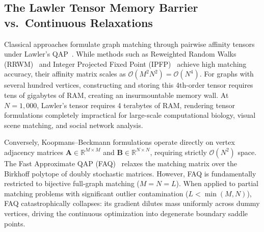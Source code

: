 \documentclass[a4paper,fleqn]{cas-dc}
\theoremstyle{thmstyleone}
\theoremstyle{thmstyletwo}
\theoremstyle{thmstylethree}
\begin{document}
\subsection{The Lawler Tensor Memory Barrier vs.\ Continuous Relaxations}
Classical approaches formulate graph matching through pairwise affinity tensors under Lawler's QAP~\cite{lawler1963, leordeanu2005}. While methods such as Reweighted Random Walks (RRWM)~\cite{cho2010rrwm} and Integer Projected Fixed Point (IPFP)~\cite{leordeanu2009ipfp} achieve high matching accuracy, their affinity matrix scales as $\mathcal{O}(M^2 N^2) = \mathcal{O}(N^4)$. For graphs with several hundred vertices, constructing and storing this 4th-order tensor requires tens of gigabytes of RAM, creating an insurmountable memory wall. At $N = 1{,}000$, Lawler's tensor requires 4 terabytes of RAM, rendering tensor formulations completely impractical for large-scale computational biology, visual scene matching, and social network analysis.

Conversely, Koopmans--Beckmann formulations operate directly on vertex adjacency matrices $\mathbf{A} \in \mathbb{R}^{M \times M}$ and $\mathbf{B} \in \mathbb{R}^{N \times N}$, requiring strictly $\mathcal{O}(N^2)$ space. The Fast Approximate QAP (FAQ)~\cite{vogelstein2015fast} relaxes the matching matrix over the Birkhoff polytope of doubly stochastic matrices. However, FAQ is fundamentally restricted to bijective full-graph matching ($M = N = L$). When applied to partial matching problems with significant outlier contamination ($L < \min(M, N)$), FAQ catastrophically collapses: its gradient dilutes mass uniformly across dummy vertices, driving the continuous optimization into degenerate boundary saddle points.
\end{document}
